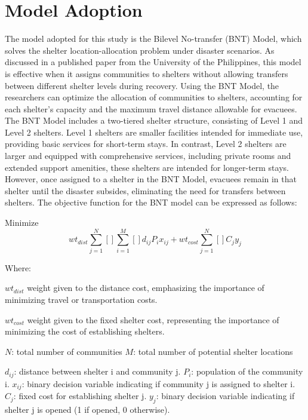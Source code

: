 \section{Model Adoption}

The model adopted for this study is the Bilevel No-transfer (BNT) Model, which solves the shelter location-allocation problem under disaster scenarios. As discussed in a published paper from the University of the Philippines, this model is effective when it assigns communities to shelters without allowing transfers between different shelter levels during recovery. Using the BNT Model, the researchers can optimize the allocation of communities to shelters, accounting for each shelter’s capacity and the maximum travel distance allowable for evacuees.
The BNT Model includes a two-tiered shelter structure, consisting of Level 1 and Level 2 shelters. Level 1 shelters are smaller facilities intended for immediate use, providing basic services for short-term stays. In contrast, Level 2 shelters are larger and equipped with comprehensive services, including private rooms and extended support amenities, these shelters are intended for longer-term stays. However, once assigned to a shelter in the BNT Model, evacuees remain in that shelter until the disaster subsides, eliminating the need for transfers between shelters.
The objective function for the BNT model can be expressed as follows:

Minimize \begin{equation} wt_{dist}\sum_{j=1}^{N}\left[  \right]\sum_{i=1}^{M}\left[  \right]d_{ij}P_{i}x_{ij}+wt_{cost}\sum_{j=1}^{N}\left[  \right]C_{j}y_{j} \end{equation}

Where:

$wt_{dist}$ weight given to the distance cost, emphasizing the importance of minimizing travel or transportation costs.

$wt_{cost}$ weight given to the fixed shelter cost, representing the importance of minimizing the cost of establishing shelters.

$N$: total number of communities
$M$: total number of potential shelter locations

$d_{ij}$: distance between shelter i and community j.
$P_{i}$: population of the community i.
$x_{ij}$: binary decision variable indicating if community j is assigned to shelter i.
$C_{j}$: fixed cost for establishing shelter j.
$y_{j}$: binary decision variable indicating if shelter j is opened (1 if opened, 0 otherwise).

